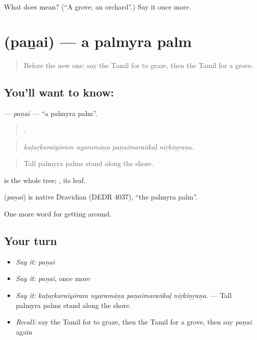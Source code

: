 \begin{tcolorbox}[breakable,colback=teal!4,colframe=teal!35!black,title={Before you move on}]
What does  mean? (\textquotedblleft{}A grove; an orchard\textquotedblright{}.) Say it once more.
\end{tcolorbox}
\section[\texorpdfstring{\ta{பனை} (paṉai)}{பனை (paṉai)}]{ (paṉai) — a palmyra palm}

\label{lesson:TA-C434-panai}



\begin{quote}
Before the new one: say the Tamil for to graze, then the Tamil for a grove.
\end{quote}

\subsection*{You'll want to know: }
\textbf{} — \emph{paṉai} — \textquotedblleft{}a palmyra palm\textquotedblright{}.

\begin{quote}
   .
\end{quote}

\begin{quote}
\emph{kaṭaṟkaraiyōram uyaramāṉa paṉaimaraṅkaḷ niṟkiṉṟaṉa.}
\end{quote}

\begin{quote}
Tall palmyra palms stand along the shore.
\end{quote}

 is the whole tree; , its leaf.

\begin{cousinweb}
\textbf{} (\emph{paṉai}) is native Dravidian (DEDR 4037), \textquotedblleft{}the palmyra palm\textquotedblright{}.
\end{cousinweb}

\begin{grammarlens}[title={What you've built}]
One more word for getting around.
\end{grammarlens}

\subsection*{Your turn}
\begin{itemize}
\raggedright
  \item \emph{Say it:} \emph{paṉai}
  \item \emph{Say it:} \emph{paṉai}, once more
  \item \emph{Say it:} \emph{kaṭaṟkaraiyōram uyaramāṉa paṉaimaraṅkaḷ niṟkiṉṟaṉa.} — Tall palmyra palms stand along the shore.
  \item \emph{Recall:} say the Tamil for to graze, then the Tamil for a grove, then say \emph{paṉai} again
\end{itemize}

